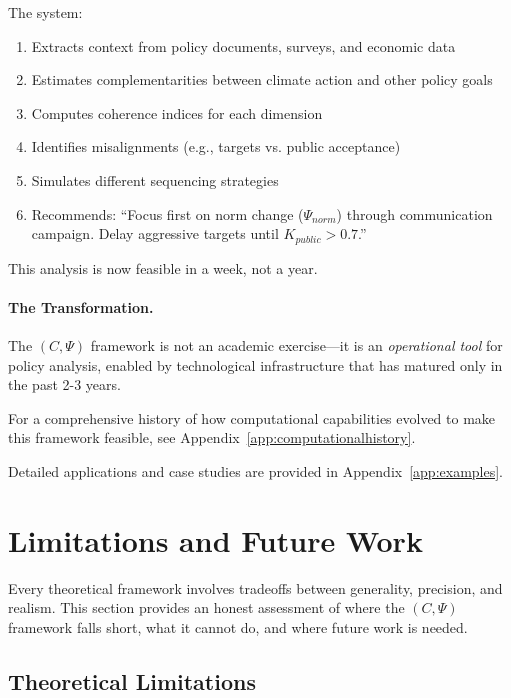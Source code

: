 \documentclass[12pt,a4paper]{article}
\begin{document}
The system:
\begin{enumerate}
  \item Extracts context from policy documents, surveys, and economic data
  \item Estimates complementarities between climate action and other policy goals
  \item Computes coherence indices for each dimension
  \item Identifies misalignments (e.g., targets vs. public acceptance)
  \item Simulates different sequencing strategies
  \item Recommends: ``Focus first on norm change ($\Psi_{norm}$) through
        communication campaign. Delay aggressive targets until $K_{public} > 0.7$.''
\end{enumerate}

This analysis is now feasible in a week, not a year.

\paragraph{The Transformation.}
The $(C, \Psi)$ framework is not an academic exercise---it is an
\emph{operational tool} for policy analysis, enabled by technological infrastructure
that has matured only in the past 2-3 years.

For a comprehensive history of how computational capabilities evolved
to make this framework feasible, see Appendix~\ref{app:computationalhistory}.

Detailed applications and case studies are provided in Appendix~\ref{app:examples}.

\section{Limitations and Future Work}
\label{sec:limitations}

Every theoretical framework involves tradeoffs between generality, precision, and realism.
This section provides an honest assessment of where the $(C, \Psi)$ framework
falls short, what it cannot do, and where future work is needed.

\subsection{Theoretical Limitations}
\end{document}
